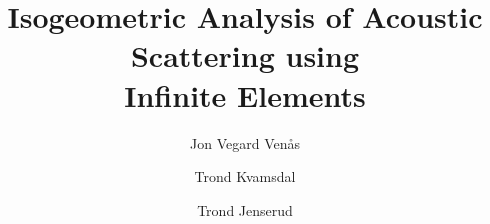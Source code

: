 \label{Part:paperII}
\renewcommand{\contents}{contents/IGA_article}%
\begin{pFrontmatter}
    \title{Isogeometric Analysis of Acoustic Scattering using\\Infinite Elements}
	\author[a,$\ast$]{Jon Vegard Ven{\aa}s}%
	\author[a]{Trond Kvamsdal}%
	\author[b]{Trond Jenserud}%
	\address[a]{Department of Mathematical Sciences, Norwegian University of Science and Technology,\\Alfred Getz' vei 1, 7034 Trondheim, Norway}%
	\address[b]{Department of Marine Systems, Norwegian Defence Research Establishment,\\Postboks 115, 3191 Horten, Norway}%
	\begin{abstract}%
		
	\end{abstract}%
\end{pFrontmatter}






%
\begin{inputAppendices}




\end{inputAppendices}

